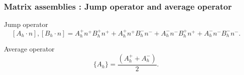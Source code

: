 \documentclass{beamer}
\begin{document}
\begin{frame}
\frametitle{Matrix assemblies : Jump operator and average operator}

\begin{block}{Jump operator}
\begin{equation} \label{Jump operator L2}
[A_h \cdot n],[B_h \cdot n] = A_h^+ n^+ B_h^+ n^+ + A_h^+ n^+ B_h^- n^- + A_h^- n^- B_h^+ n^+ + A_h^- n^- B_h^- n^- \textrm{.}
\end{equation}
\end{block}

\begin{block}{Average operator}
\begin{equation}\label{Average operator}
\lbrace A_h \rbrace = \frac{(A_h^+ + A_h^-)}{2} \textrm{.}
\end{equation}
\end{block}

\end{frame}
\end{document}
